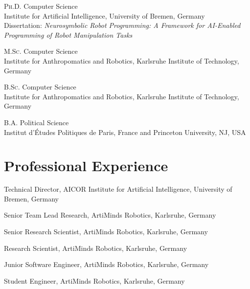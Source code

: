 \documentclass[11pt]{article} %
\begin{document}
\textsc{Ph.D.} Computer Science\\
Institute for Artificial Intelligence, University of Bremen, Germany\\
Dissertation: \textit{Neurosymbolic Robot Programming: A Framework for AI-Enabled Programming of Robot Manipulation Tasks}

\medskip

\textsc{M.Sc.} Computer Science\\
Institute for Anthropomatics and Robotics, Karlsruhe Institute of Technology, Germany

\medskip

\textsc{B.Sc.} Computer Science\\
Institute for Anthropomatics and Robotics, Karlsruhe Institute of Technology, Germany

\medskip

\textsc{B.A.} Political Science\\
Institut d'Études Politiques de Paris, France and Princeton University, NJ, USA


\section*{Professional Experience}

Technical Director, AICOR Institute for Artificial Intelligence, University of Bremen, Germany

\medskip

Senior Team Lead Research, ArtiMinds Robotics, Karlsruhe, Germany

\medskip

Senior Research Scientist, ArtiMinds Robotics, Karlsruhe, Germany

\medskip

Research Scientist, ArtiMinds Robotics, Karlsruhe, Germany

\medskip

Junior Software Engineer, ArtiMinds Robotics, Karlsruhe, Germany

\medskip

Student Engineer, ArtiMinds Robotics, Karlsruhe, Germany
\end{document}
